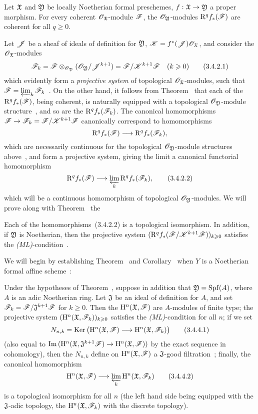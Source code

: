 \begin{thm}[3.4.2]
\label{3.3.4.2}
Let $\mathfrak{X}$ and $\mathfrak{Y}$ be locally Noetherian formal preschemes, $f:\fk{X}\to\fk{Y}$ a proper morphism.
For every coherent $\mathscr{O}_\mathfrak{X}$-module $\mathscr{F}$, the $\mathscr{O}_\mathfrak{Y}$-modules $\mathrm{R}^q f_*(\mathscr{F})$ are coherent for all $q\geq 0$.
\end{thm}

Let $\mathscr{J}$ be a sheaf of ideals of definition for $\mathfrak{Y}$, $\mathscr{K}=f^*(\mathscr{J})\mathscr{O}_\mathfrak{X}$, and consider the $\mathscr{O}_\mathfrak{X}$-modules
\[
\label{3.3.4.2.1}
  \mathscr{F}_k=\mathscr{F}\otimes_{\mathscr{O}_\mathfrak{Y}}(\mathscr{O}_\mathfrak{Y}/\mathscr{J}^{k+1})=\mathscr{F}/\mathscr{K}^{k+1}\mathscr{F}\quad(k\geqslant 0)
  \tag{3.4.2.1}
\]
which evidently form a \emph{projective system} of topological $\mathscr{O}_\mathfrak{X}$-modules, such that
$\mathscr{F}=\varprojlim_k\mathscr{F}_k$~.
On the other hand, it follows from Theorem~ that each of the $\mathrm{R}^q f_*(\mathscr{F})$, being coherent, is naturally equipped with a topological $\mathscr{O}_\mathfrak{Y}$-module structure~, and so are the $\mathrm{R}^q f_*(\mathscr{F}_k)$.
The canonical homomorphisms $\sh{F}\to\sh{F}_k=\sh{F}/\sh{K}^{k+1}\sh{F}$ canonically correspond to homomorphisms
\[
  \RR^q f_*(\sh{F})\to\RR^q f_*(\sh{F}_k),
\]
which are necessarily continuous for the topological $\mathscr{O}_\mathfrak{Y}$-module structures above~, and form a projective system, giving the limit a canonical functorial homomorphism
\[
\label{3.3.4.2.2}
  \RR^q f_*(\sh{F})\to\varprojlim_k\RR^q f_*(\sh{F}_k),
  \tag{3.4.2.2}
\]
which will be a continuous homomorphism of topological $\mathscr{O}_\mathfrak{Y}$-modules.
We will prove along with Theorem~ the
\begin{cor}[3.4.3]
\label{3.3.4.3}
Each of the homomorphisms~(3.4.2.2) is a topological isomorphism.
In addition, if $\mathfrak{Y}$ is Noetherian, then the projective system $(\mathrm{R}^q f_*(\mathscr{F}/\mathscr{K}^{k+1}\mathscr{F}))_{k\geqslant 0}$ satisfies the \emph{(ML)}-condition~.
\end{cor}
We will begin by establishing Theorem~ and Corollary~ when $Y$ is a Noetherian formal affine scheme~:
\begin{cor}[3.4.4]
\label{3.3.4.4}
Under the hypotheses of Theorem~, suppose in addition that $\mathfrak{Y}={\mathop{\mathrm{Spf}}\nolimits}(A)$, where $A$ is an adic Noetherian ring.
Let $\mathfrak{J}$ be an ideal of definition for $A$, and set $\mathscr{F}_k=\mathscr{F}/\mathfrak{J}^{k+1}\mathscr{F}$ for $k\geq 0$.
Then the $\mathrm{H}^n(\mathfrak{X},\mathscr{F})$ are $A$-modules of finite type; the projective system $(\mathrm{H}^n(\mathfrak{X},\mathscr{F}_k))_{k\geqslant 0}$ satisfies the \emph{(ML)}-condition for all $n$; if we set
\[
\label{3.3.4.4.1}
  N_{n,k}=\Ker\big(\HH^n(\fk{X},\sh{F})\to\HH^n(\fk{X},\sh{F}_k)\big)
  \tag{3.4.4.1}
\]
(also equal to $\Im(\HH^n(\fk{X},\fk{J}^{k+1}\sh{F})\to\HH^n(\fk{X},\sh{F}))$ by the exact sequence in cohomology), then the $N_{n,k}$ define on $\mathrm{H}^n(\mathfrak{X},\mathscr{F})$ a $\mathfrak{J}$-good filtration~; finally, the canonical homomorphism
\[
\label{3.3.4.4.2}
  \HH^n(\fk{X},\sh{F})\to\varprojlim_k\HH^n(\fk{X},\sh{F}_k)
  \tag{3.4.4.2}
\]
is a topological isomorphism for all $n$ (the left hand side being equipped with the $\mathfrak{J}$-adic topology, the $\mathrm{H}^n(\mathfrak{X},\mathscr{F}_k)$ with the discrete topology).
\end{cor}

